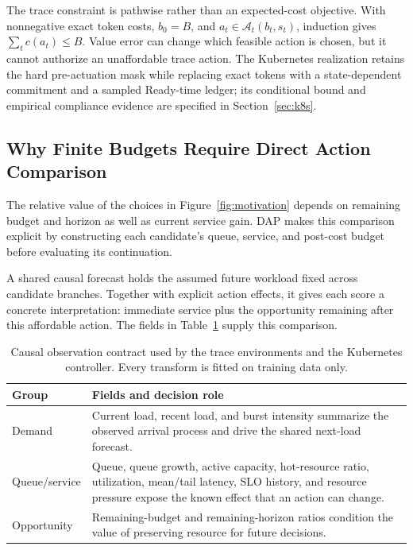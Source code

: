 \documentclass[acmsmall,screen,review,anonymous]{acmart}
\begin{document}
The trace constraint is pathwise rather than an expected-cost objective.  With
nonnegative exact token costs, \(b_0=B\), and
\(a_t\in\mathcal A_t(b_t,s_t)\), induction gives
\(\sum_t c(a_t)\leq B\).  Value error can change which feasible action is
chosen, but it cannot authorize an unaffordable trace action.  The Kubernetes
realization retains the hard pre-actuation mask while replacing exact tokens
with a state-dependent commitment and a sampled Ready-time ledger; its
conditional bound and empirical compliance evidence are specified in
Section~\ref{sec:k8s}.

\subsection{Why Finite Budgets Require Direct Action Comparison}

The relative value of the choices in Figure~\ref{fig:motivation} depends on
remaining budget and horizon as well as current service gain. DAP makes this
comparison explicit by constructing each candidate's queue, service, and
post-cost budget before evaluating its continuation.

A shared causal forecast holds the assumed future workload fixed across
candidate branches. Together with explicit action effects, it gives each
score a concrete interpretation: immediate service plus the opportunity
remaining after this affordable action. The fields in Table~\ref{tab:state}
supply this comparison.

\begin{table}[t]
\caption{Causal observation contract used by the trace environments and the
Kubernetes controller.  Every transform is fitted on training data only.}
\label{tab:state}
\small
\begin{tabular}{p{.25\linewidth}p{.68\linewidth}}
\toprule
Group & Fields and decision role\\
\midrule
Demand & Current load, recent load, and burst intensity summarize the observed
arrival process and drive the shared next-load forecast.\\
Queue/service & Queue, queue growth, active capacity, hot-resource ratio,
utilization, mean/tail latency, SLO history, and resource pressure expose the
known effect that an action can change.\\
Opportunity & Remaining-budget and remaining-horizon ratios condition the value
of preserving resource for future decisions.\\
\bottomrule
\end{tabular}
\end{table}
\end{document}
